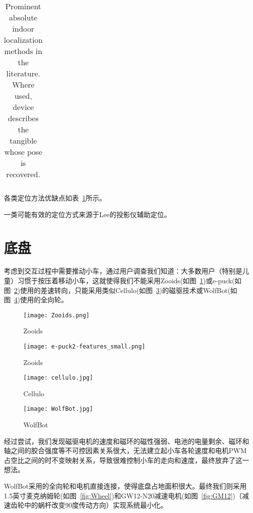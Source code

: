 \begin{landscape}
\begin{table}[htbp]
\begin{tabular}{lllllll}
    \end{tabular}
    \caption{Prominent absolute indoor localization methods in the literature. Where used, device describes the tangible whose pose is recovered. }
    \label{tab:localization}
    \end{table}
\end{landscape}

各类定位方法优缺点\cite{ozgur2018cellulo}如表~\ref{tab:localization}所示。

一类可能有效的定位方式来源于Lee\cite{lee2005moveable}的投影仪辅助定位。


\section{底盘}
考虑到交互过程中需要推动小车，通过用户调查我们知道：大多数用户（特别是儿童）习惯于按压着移动小车，这就使得我们不能采用Zooids\cite{le2016zooids}(如图~\ref{fig:Zooids})或e-puck\cite{mondada2009puck}(如图~\ref{fig:e-puck})使用的差速转向，只能采用类似Cellulo\cite{ozgur2017cellulo}(如图~\ref{fig:Cellulo})的磁驱技术或WolfBot\cite{betthauser2014wolfbot}(如图~\ref{fig:WolfBot})使用的全向轮。

\begin{figure}[htbp]
    \centering
    \texttt{[image: Zooids.png]}
    \caption{Zooids}
    \label{fig:Zooids}
\end{figure}

\begin{figure}[htbp]
    \centering
    \texttt{[image: e-puck2-features\_small.png]}
    \caption{Zooids}
    \label{fig:e-puck}
\end{figure}

\begin{figure}[htbp]
    \centering
    \texttt{[image: cellulo.jpg]}
    \caption{Cellulo}
    \label{fig:Cellulo}
\end{figure}
  
\begin{figure}[htbp]
    \centering
    \texttt{[image: WolfBot.jpg]}
    \caption{WolfBot}
    \label{fig:WolfBot}
\end{figure}

经过尝试，我们发现磁驱电机的速度和磁环的磁性强弱、电池的电量剩余、磁环和轴之间的胶合强度等不可控因素关系很大，无法建立起小车各轮速度和电机PWM占空比之间的时不变映射关系，导致很难控制小车的走向和速度，最终放弃了这一想法。

WolfBot采用的全向轮和电机直接连接，使得底盘占地面积很大。最终我们则采用1.5英寸麦克纳姆轮(如图~\ref{fig:Wheel})和GW12-N20减速电机(如图~\ref{fig:GM12})（减速齿轮中的蜗杆改变90度传动方向）实现系统最小化。

